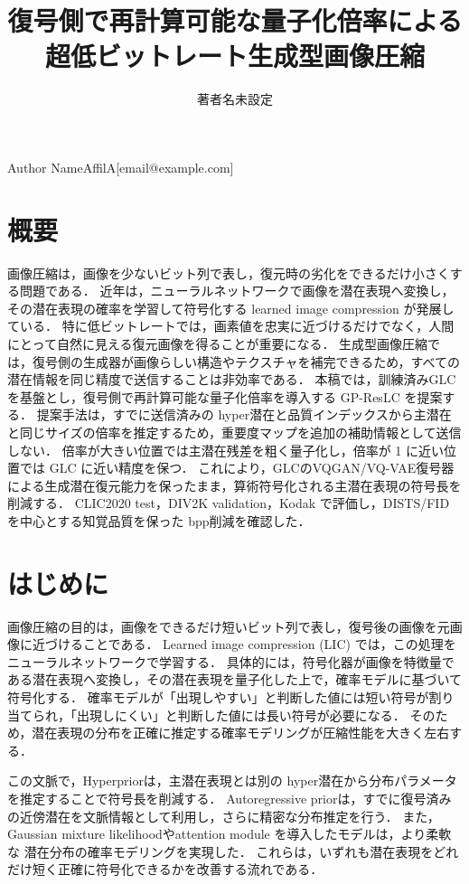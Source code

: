 \documentclass[MIRU,submit]{miru2026j}
\begin{document}
\title{復号側で再計算可能な量子化倍率による\\
超低ビットレート生成型画像圧縮}

\author{著者名未設定}{Author Name}{AffilA}[email@example.com]

\maketitle

\section*{概要}
画像圧縮は，画像を少ないビット列で表し，復元時の劣化をできるだけ小さくする問題である．
近年は，ニューラルネットワークで画像を潜在表現へ変換し，その潜在表現の確率を学習して符号化する learned image compression が発展している．
特に低ビットレートでは，画素値を忠実に近づけるだけでなく，人間にとって自然に見える復元画像を得ることが重要になる．
生成型画像圧縮では，復号側の生成器が画像らしい構造やテクスチャを補完できるため，すべての潜在情報を同じ精度で送信することは非効率である．
本稿では，訓練済みGLCを基盤とし，復号側で再計算可能な量子化倍率を導入する GP-ResLC を提案する．
提案手法は，すでに送信済みの hyper潜在と品質インデックスから主潜在と同じサイズの倍率を推定するため，重要度マップを追加の補助情報として送信しない．
倍率が大きい位置では主潜在残差を粗く量子化し，倍率が 1 に近い位置では GLC に近い精度を保つ．
これにより，GLCのVQGAN/VQ-VAE復号器による生成潜在復元能力を保ったまま，算術符号化される主潜在表現の符号長を削減する．
CLIC2020 test，DIV2K validation，Kodak で評価し，DISTS/FID を中心とする知覚品質を保った bpp削減を確認した．

\section{はじめに}
画像圧縮の目的は，画像をできるだけ短いビット列で表し，復号後の画像を元画像に近づけることである．
Learned image compression (LIC) では，この処理をニューラルネットワークで学習する．
具体的には，符号化器が画像を特徴量である潜在表現へ変換し，その潜在表現を量子化した上で，確率モデルに基づいて符号化する．
確率モデルが「出現しやすい」と判断した値には短い符号が割り当てられ，「出現しにくい」と判断した値には長い符号が必要になる．
そのため，潜在表現の分布を正確に推定する確率モデリングが圧縮性能を大きく左右する．

この文脈で，Hyperpriorは，主潜在表現とは別の hyper潜在から分布パラメータを推定することで符号長を削減する\cite{balle2018}．
Autoregressive priorは，すでに復号済みの近傍潜在を文脈情報として利用し，さらに精密な分布推定を行う\cite{minnen2018}．
また，Gaussian mixture likelihoodやattention module を導入したモデルは，より柔軟な 潜在分布の確率モデリングを実現した\cite{cheng2020}．
これらは，いずれも潜在表現をどれだけ短く正確に符号化できるかを改善する流れである．
\end{document}
